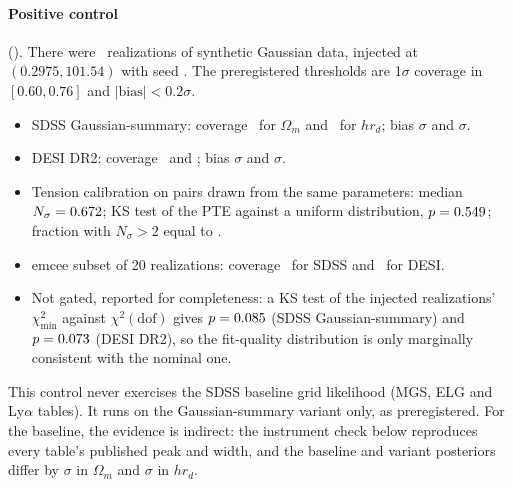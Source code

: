 \documentclass[11pt]{article}
\begin{document}
\paragraph{Positive control} (\PcPass). There were \PcN\ realizations of
synthetic Gaussian data, injected at $(0.2975, 101.54)$ with seed \PcSeed.
The preregistered thresholds are 1$\sigma$ coverage in $[0.60,0.76]$ and
$|\mathrm{bias}|<0.2\sigma$.
\begin{itemize}
\item SDSS Gaussian-summary: coverage \PcSCovOm\ for $\Omega_m$ and
  \PcSCovHrd\ for $h r_d$; bias \PcSBiasOm$\sigma$ and \PcSBiasHrd$\sigma$.
\item DESI DR2: coverage \PcDCovOm\ and \PcDCovHrd; bias \PcDBiasOm$\sigma$
  and \PcDBiasHrd$\sigma$.
\item Tension calibration on pairs drawn from the same parameters: median
  $N_\sigma=0.672$; KS test of the PTE against a uniform distribution,
  $p=0.549$; fraction with $N_\sigma>2$ equal to \PcTGtTwo.
\item emcee subset of 20 realizations: coverage \PcSEmCov\ for SDSS and
  \PcDEmCov\ for DESI.
\item Not gated, reported for completeness: a KS test of the injected
  realizations' $\chi^2_\mathrm{min}$ against $\chi^2(\mathrm{dof})$ gives
  $p=0.085$ (SDSS Gaussian-summary) and $p=0.073$ (DESI DR2), so
  the fit-quality distribution is only marginally consistent with the
  nominal one.
\end{itemize}
This control never exercises the SDSS baseline grid likelihood (MGS, ELG
and Ly$\alpha$ tables). It runs on the Gaussian-summary variant only, as
preregistered. For the baseline, the evidence is indirect: the instrument
check below reproduces every table's published peak and width, and the
baseline and variant posteriors differ by \ShiftOm$\sigma$ in $\Omega_m$ and
\ShiftHrd$\sigma$ in $h r_d$.
\end{document}
